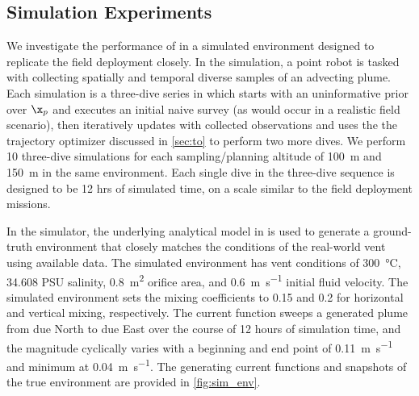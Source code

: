 \subsection{Simulation Experiments}
We investigate the performance of \PHORTEX in a simulated environment designed to replicate the field deployment closely. In the simulation, a point robot is tasked with collecting spatially and temporal diverse samples of an advecting plume. Each simulation is a three-dive series in which \PHORTEX starts with an uninformative prior over $\x_p$ and executes an initial naive survey (as would occur in a realistic field scenario), then iteratively updates \PHORTEX with collected observations and uses the the trajectory optimizer discussed in \cref{sec:to} to perform two more dives. We perform 10 three-dive simulations for each sampling/planning altitude of \SI{100}{\meter} and \SI{150}{\meter} in the same environment. Each single dive in the three-dive sequence is designed to be 12 hrs of simulated time, on a scale similar to the field deployment missions. 

In the simulator, the underlying analytical model in \PHUMES is used to generate a ground-truth environment that closely matches the conditions of the real-world vent using available data. The simulated environment has vent conditions of \SI{300}{\celsius}, 34.608 PSU salinity, \SI{0.8}{\meter\squared} orifice area, and \SI{0.6}{\meter\per\second} initial fluid velocity. The simulated environment sets the mixing coefficients to 0.15 and 0.2 for horizontal and vertical mixing, respectively. The current function sweeps a generated plume from due North to due East over the course of 12 hours of simulation time, and the magnitude cyclically varies with a beginning and end point of \SI{0.11}{\meter\per\second} and minimum at \SI{0.04}{\meter\per\second}. The generating current functions and snapshots of the true environment are provided in \cref{fig:sim_env}.

